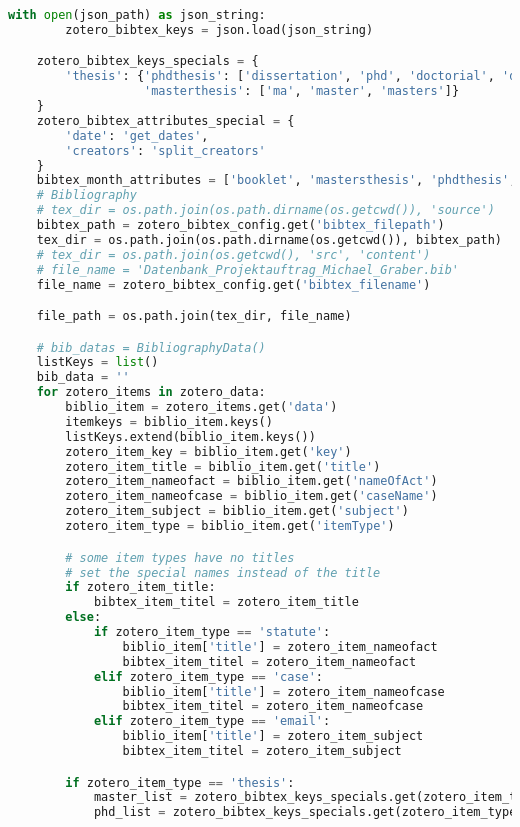 \begin{lstlisting}[language=python, caption=Python LaTex - zotero - Zotero BibLaTex Importer,captionpos=b,label={lst:zotero},breaklines=true]
    with open(json_path) as json_string:
        zotero_bibtex_keys = json.load(json_string)

    zotero_bibtex_keys_specials = {
        'thesis': {'phdthesis': ['dissertation', 'phd', 'doctorial', 'doctor', 'doktor', 'doktorarbeit'],
                   'masterthesis': ['ma', 'master', 'masters']}
    }
    zotero_bibtex_attributes_special = {
        'date': 'get_dates',
        'creators': 'split_creators'
    }
    bibtex_month_attributes = ['booklet', 'mastersthesis', 'phdthesis', 'techreport']
    # Bibliography
    # tex_dir = os.path.join(os.path.dirname(os.getcwd()), 'source')
    bibtex_path = zotero_bibtex_config.get('bibtex_filepath')
    tex_dir = os.path.join(os.path.dirname(os.getcwd()), bibtex_path)
    # tex_dir = os.path.join(os.getcwd(), 'src', 'content')
    # file_name = 'Datenbank_Projektauftrag_Michael_Graber.bib'
    file_name = zotero_bibtex_config.get('bibtex_filename')

    file_path = os.path.join(tex_dir, file_name)

    # bib_datas = BibliographyData()
    listKeys = list()
    bib_data = ''
    for zotero_items in zotero_data:
        biblio_item = zotero_items.get('data')
        itemkeys = biblio_item.keys()
        listKeys.extend(biblio_item.keys())
        zotero_item_key = biblio_item.get('key')
        zotero_item_title = biblio_item.get('title')
        zotero_item_nameofact = biblio_item.get('nameOfAct')
        zotero_item_nameofcase = biblio_item.get('caseName')
        zotero_item_subject = biblio_item.get('subject')
        zotero_item_type = biblio_item.get('itemType')

        # some item types have no titles
        # set the special names instead of the title
        if zotero_item_title:
            bibtex_item_titel = zotero_item_title
        else:
            if zotero_item_type == 'statute':
                biblio_item['title'] = zotero_item_nameofact
                bibtex_item_titel = zotero_item_nameofact
            elif zotero_item_type == 'case':
                biblio_item['title'] = zotero_item_nameofcase
                bibtex_item_titel = zotero_item_nameofcase
            elif zotero_item_type == 'email':
                biblio_item['title'] = zotero_item_subject
                bibtex_item_titel = zotero_item_subject

        if zotero_item_type == 'thesis':
            master_list = zotero_bibtex_keys_specials.get(zotero_item_type).get('masterthesis')
            phd_list = zotero_bibtex_keys_specials.get(zotero_item_type).get('phdthesis')


\end{lstlisting}
